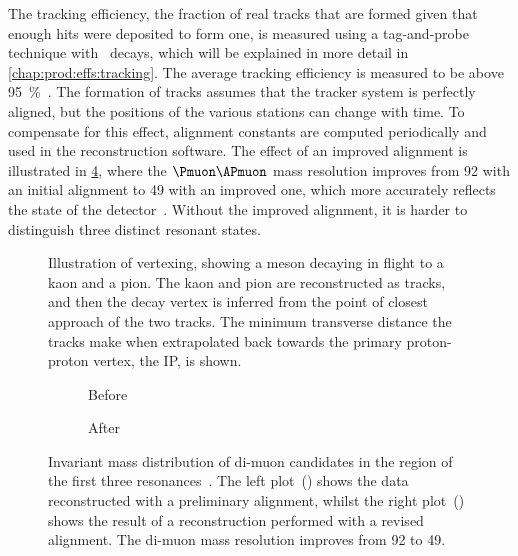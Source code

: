 The tracking efficiency, the fraction of real tracks that are formed given that 
enough hits were deposited to form one, is measured using a tag-and-probe 
technique with \JpsiTomumu\ decays, which will be explained in more detail in 
\cref{chap:prod:effs:tracking}.
The average tracking efficiency is measured to be above 
\SI{95}{\percent}~\cite{Aaij:2014pwa}.
The formation of tracks assumes that the tracker system is perfectly aligned, 
but the positions of the various stations can change with time.
To compensate for this effect, alignment constants are computed periodically 
and used in the reconstruction software.
The effect of an improved alignment is illustrated in 
\cref{fig:intro:lhcb:alignment}, where the $\Pmuon\APmuon$ mass resolution 
improves from \SI{92}{\MeVcc} with an initial alignment to \SI{49}{\MeVcc} with 
an improved one, which more accurately reflects the state of the 
detector~\cite{Dujany:082010}.
Without the improved alignment, it is harder to distinguish three distinct 
resonant states.

\begin{figure}
  \centering
  
  \caption{%
    Illustration of vertexing, showing a \PDz meson decaying in flight to a 
    kaon and a pion.
    The kaon and pion are reconstructed as tracks, and then the \PDzero decay 
    vertex is inferred from the point of closest approach of the two tracks.
    The minimum transverse distance the tracks make when extrapolated back 
    towards the primary proton-proton vertex, the \acf{IP}, is shown.
  }
  \label{fig:intro:lhcb:vertexing}
\end{figure}

\begin{figure}
  \begin{subfigure}{0.5\textwidth}
    \centering
    
    \caption{Before}
    \label{fig:intro:lhcb:alignment:pre}
  \end{subfigure}
  \begin{subfigure}{0.5\textwidth}
    \centering
    
    \caption{After}
    \label{fig:intro:lhcb:alignment:post}
  \end{subfigure}
  \caption{%
    Invariant mass distribution of di-muon candidates in the region of the 
    first three \PUpsilon resonances~\cite{Dujany:082010}.
    The left plot~() shows the data 
    reconstructed with a preliminary alignment, whilst the right 
    plot~() shows the result of a 
    reconstruction performed with a revised alignment.
    The di-muon mass resolution improves from \SI{92}{\MeVcc} to 
    \SI{49}{\MeVcc}.
  }
  \label{fig:intro:lhcb:alignment}
\end{figure}

